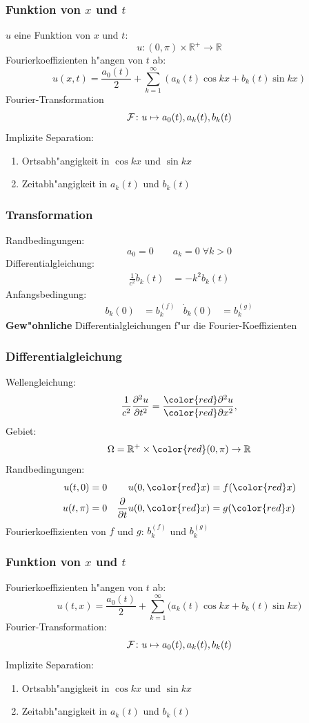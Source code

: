 \documentclass{beamer}
\begin{document}
\begin{frame}
\frametitle{Funktion von $x$ und $t$}

$u$ eine Funktion von $x$ und $t$:
\[
u\colon (0,\pi)\times \mathbb R^+\to \mathbb R
\]
Fourierkoeffizienten h"angen von $t$ ab:
\[
u(x,t)=\frac{a_0(t)}2+\sum_{k=1}^\infty (a_k(t)\cos kx+b_k(t)\sin kx)
\]
Fourier-Transformation
\[
{\cal F}\colon
u\mapsto
a_0(t), a_k(t), b_k(t)
\]
\pause
Implizite Separation:
\begin{enumerate}[<+->]
\item Ortsabh"angigkeit in $\cos kx$ und $\sin kx$
\item Zeitabh"angigkeit in $a_k(t)$ und $b_k(t)$
\end{enumerate}

\end{frame}

\begin{frame}
\frametitle{Transformation}
Randbedingungen:
\[
a_0=0\qquad
a_k=0\;\forall k > 0
\]
Differentialgleichung:
\begin{align*}
\frac{1}{c^2}\ddot b_k(t)&= -k^2b_k(t)
\end{align*}
Anfangsbedingung:
\begin{align*}
b_k(0)&= b_k^{(f)}& \dot b_k(0)&=b_k^{(g)}
\end{align*}
{\bf Gew"ohnliche} Differentialgleichungen f"ur die Fourier-Koeffizienten
\end{frame}

\begin{frame}
\frametitle{Differentialgleichung}

Wellengleichung:
\[
\frac{1}{c^2}
\frac{\partial^2 u}{\partial t^2}
=
\frac{{\color{red}\partial^2} u}{{\color{red}\partial x^2}},
\]
Gebiet:
\[
\Omega = \mathbb R^+ \times {\color{red}(0,\pi)} \to \mathbb R
\]
Randbedingungen:
\begin{align*}
u(t,   0)&= 0&u(0,{\color{red}x})&=f({\color{red}x})\\
u(t, \pi)&= 0&\frac{\partial}{\partial t}u(0,{\color{red}x})&=g({\color{red}x})
\end{align*}
Fourierkoeffizienten von $f$ und $g$: $b_k^{(f)}$ und $b^{(g)}_k$

\end{frame}

\begin{frame}
\frametitle{Funktion von $x$ und $t$}

Fourierkoeffizienten h"angen von $t$ ab:
\[
u(t,x)=\frac{a_0(t)}2+\sum_{k=1}^\infty \bigl(a_k(t)\cos kx+b_k(t)\sin kx\bigr)
\]
Fourier-Transformation:
\[
{\cal F}\colon
u\mapsto
a_0(t), a_k(t), b_k(t)
\]
Implizite Separation:
\begin{enumerate}
\item Ortsabh"angigkeit in $\cos kx$ und $\sin kx$
\item Zeitabh"angigkeit in $a_k(t)$ und $b_k(t)$
\end{enumerate}

\end{frame}
\end{document}
